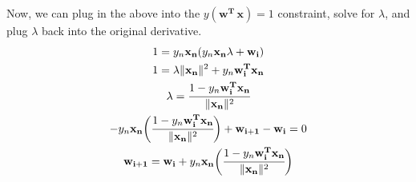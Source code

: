 \documentclass[12pt]{article}
\begin{document}
	Now, we can plug in the above into the $y(\mathbf{w^T \, x}) = 1$ constraint, solve for $\lambda$, and plug $\lambda$ back into the original derivative.
	\begin{gather*}
		1 = y_n \mathbf{x_n} ( y_n \mathbf{x_n} \lambda + \mathbf{w_i} ) \\
		1 = \lambda \lVert \mathbf{x_n} \rVert^2 + y_n \mathbf{w_i^T} \mathbf{x_n} \\
		\lambda = \cfrac{ 1 - y_n \mathbf{w_i^T} \mathbf{x_n}}{\lVert \mathbf{x_n} \rVert^2}
		\\
		-y_n \mathbf{x_n} \bigg( \cfrac{ 1 - y_n \mathbf{w_i^T} \mathbf{x_n}}{\lVert \mathbf{x_n} \rVert^2} \bigg) + \mathbf{w_{i+1}} - \mathbf{w_i} = 0 \\
		\mathbf{w_{i+1}} = \mathbf{w_i} + y_n \mathbf{x_n} \bigg( \cfrac{ 1 - y_n \mathbf{w_i^T} \mathbf{x_n}}{\lVert \mathbf{x_n} \rVert^2} \bigg)
	\end{gather*}



\end{document}
